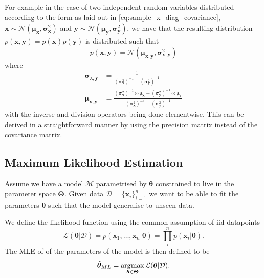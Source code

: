 For example in the case of two independent random variables distributed
according to the form as laid out in \eqref{eq:sample_x_diag_covariance}, $\bm{x} \sim
\mathcal{N}(\bm{\mu}_{\bm{x}}, \bm{\sigma}^2_{\bm{x}})$
and $\bm{y} \sim \mathcal{N}(\bm{\mu}_{\bm{y}}, \bm{\sigma}^2_{\bm{y}})$, we have that the resulting distribution $p(\bm{x}, \bm{y}) =
p(\bm{x})p(\bm{y})$ is distributed such that
\begin{equation*}
  p(\bm{x}, \bm{y}) = \mathcal{N}(\bm{\mu}_{\bm{x}, \bm{y}}, \bm{\sigma}^2_{\bm{x}, \bm{y}})
\end{equation*}
where
\begin{align}
  \bm{\sigma}_{\bm{x}, \bm{y}} & = \frac{1}{(\bm{\sigma}_{\bm{x}}^2)^{-1} + (\bm{\sigma}^2_{\bm{y}})^{-1}} \label{eq:joint_indep_normal_covariance_diag}\\
  \bm{\mu}_{\bm{x}, \bm{y}} & = \frac{(\bm{\sigma}^2_{\bm{x}})^{-1} \odot \bm{\mu}_{\bm{x}} + (\bm{\sigma}^2_{\bm{y}})^{-1} \odot \bm{\mu}_{\bm{y}}}{(\bm{\sigma}^2_{\bm{x}})^{-1} + (\bm{\sigma}^2_{\bm{y}})^{-1}} \label{eq:joint_indep_normal_mean_diag}
\end{align}
with the inverse and division operators being done elementwise. This can be
derived in a straightforward manner by using the precision matrix instead of the
covariance matrix.

\subsection{Maximum Likelihood Estimation}

Assume we have a model $\mathcal{M}$ parametrised by $\bm{\theta}$ constrained
to live in the parameter space $\bm{\Theta}$. Given data $\mathcal{D} = \{\bm{x}_i\}_{i=1}^n$ we want
to be able to fit the parameters $\bm{\theta}$ such that the model generalise to
unseen data.

We define the likelihood function using the common assumption of iid datapoints
\begin{equation}
  \label{eq:likelihood}
  \mathcal{L}(\bm{\theta} | \mathcal{D}) = p(\bm{x}_1, \dots, \bm{x}_n | \bm{\theta}) = \prod_i^n p(\bm{x}_i | \bm{\theta}).
\end{equation}
The MLE of of the parameters of the model is then defined to be
\begin{equation}
  \label{eq:MLE}
  \hat{\bm{\theta}}_{ML} = \operatorname*{\arg\!\max}_{\bm{\theta} \in \bm{\Theta}}\mathcal{L}(\bm{\theta} | \mathcal{D}).
\end{equation}


